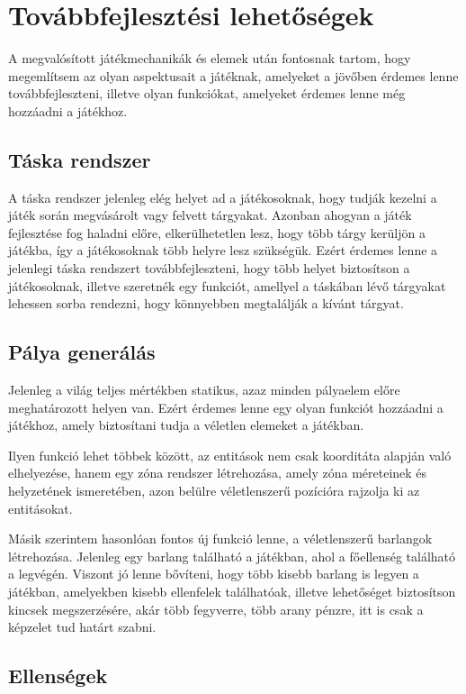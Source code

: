 \chapter{Továbbfejlesztési lehetőségek}

 A megvalósított játékmechanikák és elemek után fontosnak tartom, hogy megemlítsem az olyan aspektusait a játéknak, amelyeket a jövőben érdemes lenne továbbfejleszteni, illetve olyan funkciókat, amelyeket érdemes lenne még hozzáadni a játékhoz.


\section{Táska rendszer}
 A táska rendszer jelenleg elég helyet ad a játékosoknak, hogy tudják kezelni a játék során megvásárolt vagy felvett tárgyakat. Azonban ahogyan a játék fejlesztése fog haladni előre, elkerülhetetlen lesz, hogy több tárgy kerüljön a játékba, így a játékosoknak több helyre lesz szükségük. Ezért érdemes lenne a jelenlegi táska rendszert továbbfejleszteni, hogy több helyet biztosítson a játékosoknak, illetve szeretnék egy funkciót, amellyel a táskában lévő tárgyakat lehessen sorba rendezni, hogy könnyebben megtalálják a kívánt tárgyat.

\section{Pálya generálás}
 Jelenleg a világ teljes mértékben statikus, azaz minden pályaelem előre meghatározott helyen van. Ezért érdemes lenne egy olyan funkciót hozzáadni a játékhoz, amely biztosítani tudja a véletlen elemeket a játékban.

Ilyen funkció lehet többek között, az entitások nem csak koorditáta alapján való elhelyezése, hanem egy zóna rendszer létrehozása, amely zóna méreteinek és helyzetének ismeretében, azon belülre véletlenszerű pozícióra rajzolja ki az entitásokat.

Másik szerintem hasonlóan fontos új funkció lenne, a véletlenszerű barlangok létrehozása. Jelenleg egy barlang található a játékban, ahol a főellenség található a legvégén. Viszont jó lenne bővíteni, hogy több kisebb barlang is legyen a játékban, amelyekben kisebb ellenfelek találhatóak, illetve lehetőséget biztosítson kincsek megszerzésére, akár több fegyverre, több arany pénzre, itt is csak a képzelet tud határt szabni.

\section{Ellenségek}

